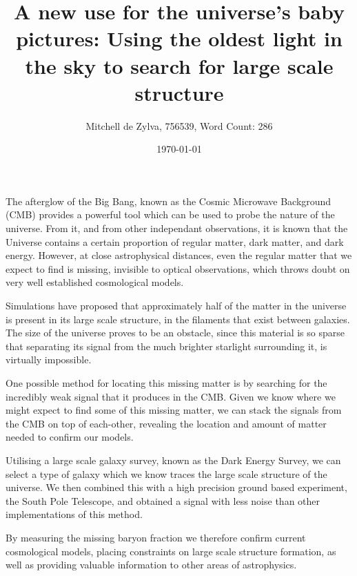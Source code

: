 \documentclass[12pt]{extarticle}
\title{A new use for the universe's baby pictures: Using the oldest light in the sky to search for large scale structure}
\author{Mitchell de Zylva, 756539, Word Count: 286}
\date{\today}
\begin{document}
\maketitle

The afterglow of the Big Bang, known as the Cosmic Microwave Background (CMB) provides a powerful tool which can be used to probe the nature of the universe. From it, and from other independant observations, it is known that the Universe contains a certain proportion of regular matter, dark matter, and dark energy. However, at close astrophysical distances, even the regular matter that we expect to find is missing, invisible to optical observations, which throws doubt on very well established cosmological models. 

\par Simulations have proposed that approximately half of the matter in the universe is present in its large scale structure, in the filaments that exist between galaxies. The size of the universe proves to be an obstacle, since this material is so sparse that separating its signal from the much brighter starlight surrounding it, is virtually impossible.
 
\par One possible method for locating this missing matter is by searching for the incredibly weak signal that it produces in the CMB. Given we know where we might expect to find some of this missing matter, we can stack the signals from the CMB on top of each-other, revealing the location and amount of matter needed to confirm our models. 

\par Utilising a large scale galaxy survey, known as the Dark Energy Survey, we can select a type of galaxy which we know traces the large scale structure of the universe. We then combined this with a high precision ground based experiment, the South Pole Telescope, and obtained a signal  with less noise than other implementations of this method.
 
\par By measuring the missing baryon fraction we therefore confirm current cosmological models,  placing constraints on large scale structure formation, as well as providing valuable information to other areas of astrophysics.
\end{document}
